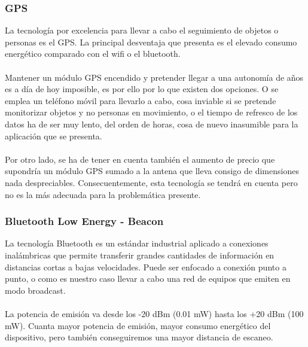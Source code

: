 \documentclass[paper=a4, fontsize=11pt,twoside]{scrartcl}	%
\begin{document}
        \subsubsection {GPS}
            La tecnología por excelencia para llevar a cabo el seguimiento de objetos o personas es el GPS. La principal desventaja
            que presenta es el elevado consumo energético comparado con el wifi o el bluetooth.
            \paragraph{}
            Mantener un módulo GPS encendido y pretender llegar a una autonomía de años es a día de hoy
            imposible, es por ello por lo que existen dos opciones.
            O se emplea un teléfono móvil para llevarlo a cabo, cosa inviable si se pretende monitorizar objetos y no personas en
            movimiento, o el tiempo de refresco de los datos ha de ser muy lento, del orden de horas,
            cosa de nuevo inasumible para la aplicación que se presenta.
            \paragraph{}
            Por otro lado, se ha de tener en cuenta también el aumento de precio que supondría un módulo GPS sumado a la antena que lleva consigo de 
            dimensiones nada despreciables. 
            Consecuentemente, esta tecnología se tendrá en cuenta pero no es la más adecuada para la problemática presente.
        \subsubsection {Bluetooth Low Energy - Beacon}
            La tecnología Bluetooth es un estándar industrial aplicado a conexiones inalámbricas que permite transferir 
            grandes cantidades de información en distancias cortas a bajas velocidades. Puede ser enfocado a conexión
            punto a punto, o como es nuestro caso llevar a cabo una red de equipos que emiten en modo broadcast.
            \paragraph{}
            La potencia de emisión va desde los -20 dBm (0.01 mW) hasta los +20 dBm (100 mW). Cuanta mayor potencia de emisión, mayor consumo energético
            del dispositivo, pero también conseguiremos una mayor distancia de escaneo.
\end{document}
